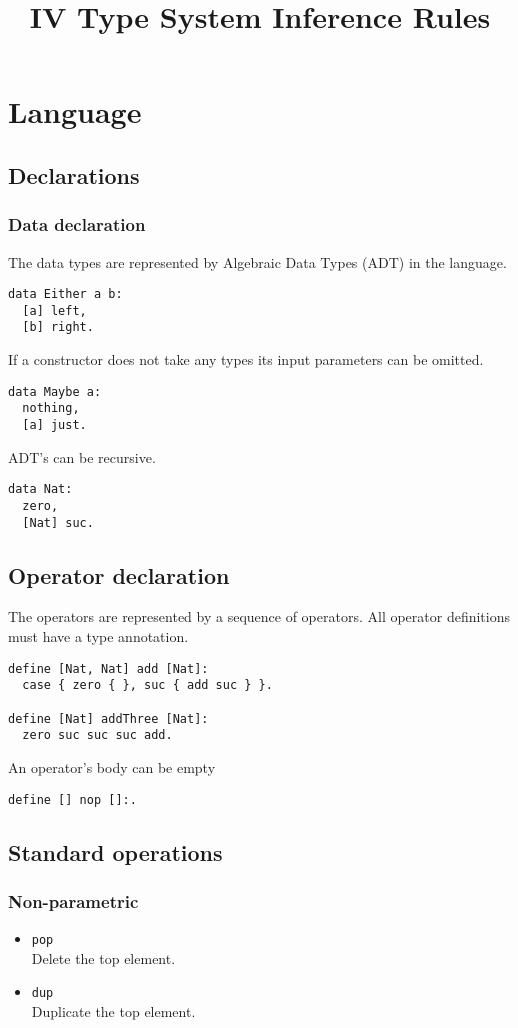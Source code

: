 \documentclass{article}
\title{IV Type System Inference Rules}
\begin{document}
\maketitle

\section*{Language}

\subsection*{Declarations}

\subsubsection*{Data declaration}
The data types are represented by Algebraic Data Types (ADT) in the language.
\begin{verbatim}
data Either a b:
  [a] left,
  [b] right.
\end{verbatim}
If a constructor does not take any types its input parameters can be omitted.
\begin{verbatim}
data Maybe a:
  nothing,
  [a] just.
\end{verbatim}
ADT's can be recursive.
\begin{verbatim}
data Nat:
  zero,
  [Nat] suc.
\end{verbatim}

\subsection*{Operator declaration}
The operators are represented by a sequence of operators. All operator
definitions must have a type annotation.
\begin{verbatim}
define [Nat, Nat] add [Nat]:
  case { zero { }, suc { add suc } }.

define [Nat] addThree [Nat]:
  zero suc suc suc add.
\end{verbatim}
An operator's body can be empty
\begin{verbatim}
define [] nop []:.
\end{verbatim}

\subsection*{Standard operations}

\subsubsection*{Non-parametric}
\begin{itemize}
  \item \texttt{pop} \\
    Delete the top element.
  \item \texttt{dup} \\
    Duplicate the top element.
\end{itemize}
\end{document}
